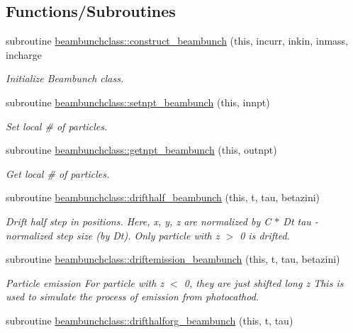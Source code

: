\subsection*{Functions/\+Subroutines}
\begin{DoxyCompactItemize}
\item 
subroutine \mbox{\hyperlink{namespacebeambunchclass_a1605e527eb41043dc5962da1e3bb5159}{beambunchclass\+::construct\+\_\+beambunch}} (this, incurr, inkin, inmass, incharge
\begin{DoxyCompactList}\small\item\em Initialize Beambunch class. \end{DoxyCompactList}\item 
subroutine \mbox{\hyperlink{namespacebeambunchclass_af1b14b706bd1283ff6c5a7cec4b06c48}{beambunchclass\+::setnpt\+\_\+beambunch}} (this, innpt)
\begin{DoxyCompactList}\small\item\em Set local \# of particles. \end{DoxyCompactList}\item 
subroutine \mbox{\hyperlink{namespacebeambunchclass_aec332b229b76111b68db82b20ab2846e}{beambunchclass\+::getnpt\+\_\+beambunch}} (this, outnpt)
\begin{DoxyCompactList}\small\item\em Get local \# of particles. \end{DoxyCompactList}\item 
subroutine \mbox{\hyperlink{namespacebeambunchclass_a269bbe3913214953b92f55253daa5b16}{beambunchclass\+::drifthalf\+\_\+beambunch}} (this, t, tau, betazini)
\begin{DoxyCompactList}\small\item\em Drift half step in positions. Here, x, y, z are normalized by C $\ast$ Dt tau -\/ normalized step size (by Dt). Only particle with z $>$ 0 is drifted. \end{DoxyCompactList}\item 
subroutine \mbox{\hyperlink{namespacebeambunchclass_a2c80320f40c450b5384dfd16c76bcc6a}{beambunchclass\+::driftemission\+\_\+beambunch}} (this, t, tau, betazini)
\begin{DoxyCompactList}\small\item\em Particle emission For particle with z $<$ 0, they are just shifted long z This is used to simulate the process of emission from photocathod. \end{DoxyCompactList}\item 
subroutine \mbox{\hyperlink{namespacebeambunchclass_a1a12151be16b0be8122e01c579035ddd}{beambunchclass\+::drifthalforg\+\_\+beambunch}} (this, t, tau)

\end{DoxyCompactItemize}
